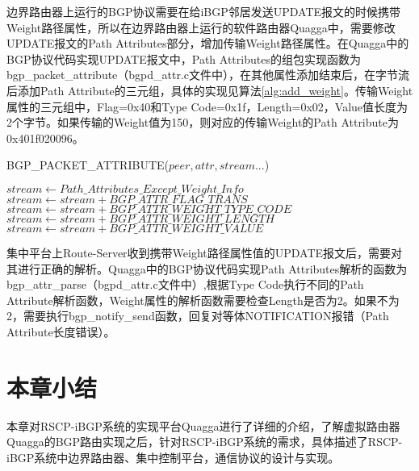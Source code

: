 边界路由器上运行的BGP协议需要在给iBGP邻居发送UPDATE报文的时候携带Weight路径属性，所以在边界路由器上运行的软件路由器Quagga中，需要修改UPDATE报文的Path Attributes部分，增加传输Weight路径属性。在Quagga中的BGP协议代码实现UPDATE报文中，Path Attributes的组包实现函数为bgp\_packet\_attribute（bgpd\_attr.c文件中），在其他属性添加结束后，在字节流后添加Path Attribute的三元组，具体的实现见算法\ref{alg:add_weight}。传输Weight属性的三元组中，Flag=0x40和Type Code=0x1f，Length=0x02，Value值长度为2个字节。如果传输的Weight值为150，则对应的传输Weight的Path  Attribute为0x401f020096。

\begin{algorithm}[!h]
    \caption{BGP\_PACKET\_ATTRIBUTE($peer,attr,stream...$)}%
    \label{alg:add_weight}
    \begin{algorithmic}[1]%
        \STATE $stream \gets Path\_Attributes\_Except\_Weight\_Info$
        \STATE $stream \gets stream+BGP\_ATTR\_FLAG\_TRANS$
        \STATE $stream \gets stream+BGP\_ATTR\_WEIGHT\_TYPE\_CODE$
        \STATE $stream \gets stream+BGP\_ATTR\_WEIGHT\_LENGTH$
        \STATE $stream \gets stream+BGP\_ATTR\_WEIGHT\_VALUE$
        \ENDIF
    \end{algorithmic}
\end{algorithm}


集中平台上Route-Server收到携带Weight路径属性值的UPDATE报文后，需要对其进行正确的解析。Quagga中的BGP协议代码实现Path Attributes解析的函数为bgp\_attr\_parse（bgpd\_attr.c文件中）,根据Type Code执行不同的Path Attribute解析函数，Weight属性的解析函数需要检查Length是否为2。如果不为2，需要执行bgp\_notify\_send函数，回复对等体NOTIFICATION报错（Path Attribute长度错误）。



\section{本章小结}
本章对RSCP-iBGP系统的实现平台Quagga进行了详细的介绍，了解虚拟路由器Quagga的BGP路由实现之后，针对RSCP-iBGP系统的需求，具体描述了RSCP-iBGP系统中边界路由器、集中控制平台，通信协议的设计与实现。
